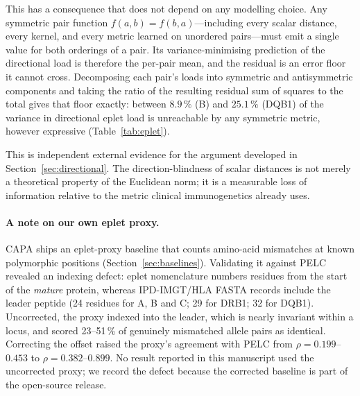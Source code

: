 \documentclass[11pt,a4paper]{article}
\begin{document}
This has a consequence that does not depend on any modelling choice.  Any
symmetric pair function $f(a,b) = f(b,a)$---including every scalar distance,
every kernel, and every metric learned on unordered pairs---must emit a single
value for both orderings of a pair.  Its variance-minimising prediction of the
directional load is therefore the per-pair mean, and the residual is an error
floor it cannot cross.  Decomposing each pair's loads into symmetric and
antisymmetric components and taking the ratio of the resulting residual sum of
squares to the total gives that floor exactly: between $8.9\,\%$ (B) and
$25.1\,\%$ (DQB1) of the variance in directional eplet load is unreachable by
any symmetric metric, however expressive (Table~\ref{tab:eplet}).

This is independent external evidence for the argument developed in
Section~\ref{sec:directional}.  The direction-blindness of scalar distances is
not merely a theoretical property of the Euclidean norm; it is a measurable
loss of information relative to the metric clinical immunogenetics already
uses.

\paragraph{A note on our own eplet proxy.}
CAPA ships an eplet-proxy baseline that counts amino-acid mismatches at known
polymorphic positions (Section~\ref{sec:baselines}).  Validating it against
PELC revealed an indexing defect: eplet nomenclature numbers residues from the
start of the \emph{mature} protein, whereas IPD-IMGT/HLA FASTA records include
the leader peptide (24 residues for A, B and C; 29 for DRB1; 32 for DQB1).
Uncorrected, the proxy indexed into the leader, which is nearly invariant
within a locus, and scored 23--51\,\% of genuinely mismatched allele pairs as
identical.  Correcting the offset raised the proxy's agreement with PELC from
$\rho = 0.199$--$0.453$ to $\rho = 0.382$--$0.899$.  No result reported in
this manuscript used the uncorrected proxy; we record the defect because the
corrected baseline is part of the open-source release.
\end{document}
